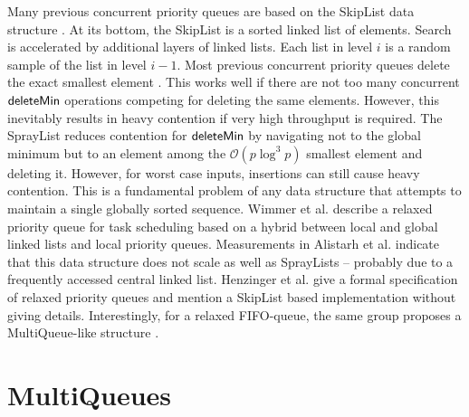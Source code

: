 \documentclass[a4paper,12pt]{article}
\newcommand{\Id}[1]{\ensuremath{\text{{\sf #1}}}}
\newcommand{\Oh}[1]{\mathcal{O}\!\left( #1\right)}
\begin{document}
Many previous concurrent priority queues are based on the SkipList data structure \cite{Pug90}. At its bottom, the SkipList is a sorted linked list of elements. Search is accelerated by additional layers of linked lists.
Each list in level $i$ is a random sample of the list in level $i-1$.
Most previous concurrent priority queues delete the exact smallest element \cite{ShaLot00,SunTsi03,LinJon13,CMH14}. This works well if there are not too many concurrent \Id{deleteMin} operations competing for deleting the same elements. However, this inevitably results in heavy contention if very high throughput is required.
The SprayList \cite{AKLS14} reduces contention for \Id{deleteMin} by navigating not to the global minimum but to an element among the $\Oh{p\log^3 p}$ smallest element and deleting it. However, for worst case inputs, insertions can still cause heavy contention. This is a fundamental problem of any data structure that attempts to maintain a single globally sorted sequence. 
Wimmer et al. \cite{WVTCT14} describe a relaxed priority queue for task scheduling based on a hybrid between local and global linked lists and local priority queues. Measurements in Alistarh et al. \cite{AKLS14} indicate that this data structure does not scale as well as SprayLists -- probably due to a frequently accessed central linked list.
Henzinger et al. \cite{HKPSS13} give a formal specification of relaxed priority queues and mention a SkipList based implementation without giving details.
Interestingly, for a relaxed FIFO-queue, the same group proposes a MultiQueue-like structure \cite{HLHPSKS13}.



\section{MultiQueues}
\label{s:multi}
\end{document}
